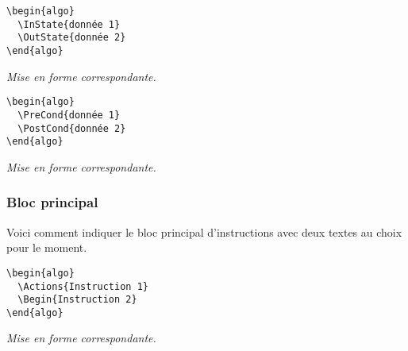 \documentclass[12pt,a4paper]{article}
\begin{document}
\begin{multicols}{2}
    \centering
    \begin{frame-gene}
\begin{verbatim}
\begin{algo}
  \InState{donnée 1}
  \OutState{donnée 2}
\end{algo}
\end{verbatim}
    \end{frame-gene}
    \vfill\null
    \columnbreak
    \textit{Mise en forme correspondante.}
\begin{algo}
\end{algo}
    \vfill\null
\end{multicols}


\begin{multicols}{2}
    \centering
    \begin{frame-gene}
\begin{verbatim}
\begin{algo}
  \PreCond{donnée 1}
  \PostCond{donnée 2}
\end{algo}
\end{verbatim}
    \end{frame-gene}
    \vfill\null
    \columnbreak
    \textit{Mise en forme correspondante.}
\begin{algo}
\end{algo}
    \vfill\null
\end{multicols}


\subsubsection{Bloc principal}

Voici comment indiquer le bloc principal d'instructions avec deux textes au choix pour le moment.


\begin{multicols}{2}
    \centering
    \begin{frame-gene}
\begin{verbatim}
\begin{algo}
  \Actions{Instruction 1}
  \Begin{Instruction 2}
\end{algo}
\end{verbatim}
    \end{frame-gene}
    \vfill\null
    \columnbreak
    \textit{Mise en forme correspondante.}
\begin{algo}
\end{algo}
    \vfill\null
\end{multicols}
\end{document}
